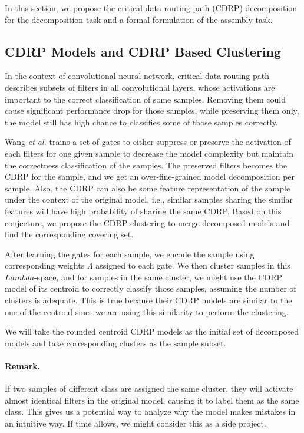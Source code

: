 \documentclass[acmsmall,nonacm]{acmart}\settopmatter{}
\begin{document}
In this section, we propose the critical data routing path (CDRP) decomposition for the decomposition task and a formal formulation of the assembly task.

\subsection{CDRP Models and CDRP Based Clustering}
In the context of convolutional neural network, critical data routing path \cite{wang2018interpret} \cite{yu2018distilling} describes subsets of filters in all convolutional layers, whose activations are important to the correct classification of some samples.
Removing them could cause significant performance drop for those samples, while preserving them only, the model still has high chance to classifies some of those samples correctly.

Wang \textit{et al.} trains a set of gates to either suppress or preserve the activation of each filters for one given sample to decrease the model complexity but maintain the correctness classification of the samples.
The preserved filters becomes the CDRP for the sample, and we get an over-fine-grained model decomposition per sample.
Also, the CDRP can also be some feature representation of the sample under the context of the original model, i.e., similar samples sharing the similar features will have high probability of sharing the same CDRP.
Based on this conjecture, we propose the CDRP clustering to merge decomposed models and find the corresponding covering set.

After learning the gates for each sample, we encode the sample using corresponding weights $\Lambda$ assigned to each gate.
We then cluster samples in this $Lambda$-space, and for samples in the same cluster, we might use the CDRP model of its centroid to correctly classify those samples, assuming the number of clusters is adequate.
This is true because their CDRP models are similar to the one of the centroid since we are using this similarity to perform the clustering.

We will take the rounded centroid CDRP models as the initial set of decomposed models and take corresponding clusters as the sample subset.

\paragraph{Remark.}
\label{par:side-project}
If two samples of different class are assigned the same cluster, they will activate almost identical filters in the original model, causing it to label them as the same class.
This gives us a potential way to analyze why the model makes mistakes in an intuitive way.
If time allows, we might consider this as a side project.
\end{document}
